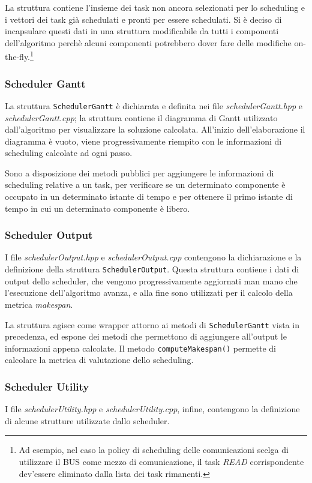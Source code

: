 La struttura contiene l'insieme dei task non ancora 
selezionati per lo scheduling e i vettori dei task già schedulati e pronti per 
essere schedulati. Si è deciso di incapsulare questi dati in una struttura 
modificabile da tutti i componenti dell'algoritmo perchè alcuni componenti 
potrebbero dover fare delle modifiche on-the-fly.\footnote{Ad esempio, nel caso 
la policy di scheduling delle comunicazioni scelga di utilizzare il BUS come 
mezzo di comunicazione, il task \emph{READ} corrispondente dev'essere 
eliminato dalla lista dei task rimanenti.}

\subsubsection{Scheduler Gantt}
La struttura \verb+SchedulerGantt+ è dichiarata e definita nei file 
\emph{schedulerGantt.hpp} e \emph{schedulerGantt.cpp}; la struttura contiene il 
diagramma di Gantt utilizzato dall'algoritmo per visualizzare la soluzione 
calcolata. All'inizio dell'elaborazione il diagramma è vuoto, viene 
progressivamente riempito con le informazioni di scheduling calcolate ad ogni 
passo.

Sono a disposizione dei metodi pubblici per aggiungere le informazioni di 
scheduling relative a un task, per verificare se un determinato componente è 
occupato in un determinato istante di tempo e per ottenere il primo istante di 
tempo in cui un determinato componente è libero.

\subsubsection{Scheduler Output}
I file \emph{schedulerOutput.hpp} e \emph{schedulerOutput.cpp} contengono la 
dichiarazione e la definizione della struttura \verb+SchedulerOutput+. Questa 
struttura contiene i dati di output dello scheduler, che vengono 
progressivamente aggiornati man mano che l'esecuzione dell'algoritmo avanza, e 
alla fine sono utilizzati per il calcolo della metrica \emph{makespan}.

La struttura agisce come wrapper attorno ai 
metodi di \verb+SchedulerGantt+ vista in precedenza, ed espone dei 
metodi che permettono di aggiungere all'output le informazioni appena calcolate.
Il metodo \verb+computeMakespan()+ permette di calcolare la metrica di valutazione
dello scheduling.

\subsubsection{Scheduler Utility}
I file \emph{schedulerUtility.hpp} e \emph{schedulerUtility.cpp}, infine, 
contengono la definizione di alcune strutture utilizzate dallo 
scheduler.

